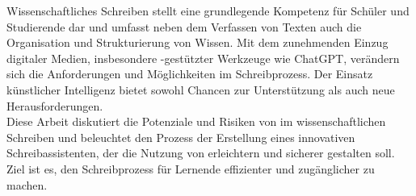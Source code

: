 \documentclass[../main.tex]{subfiles}
\begin{document}
Wissenschaftliches Schreiben stellt eine grundlegende Kompetenz für Schüler und Studierende 
dar und umfasst neben dem Verfassen von Texten auch die Organisation und Strukturierung von Wissen. 
Mit dem zunehmenden Einzug digitaler Medien, insbesondere -gestützter Werkzeuge wie ChatGPT, verändern 
sich die Anforderungen und Möglichkeiten im Schreibprozess. Der Einsatz künstlicher Intelligenz bietet sowohl 
Chancen zur Unterstützung als auch neue Herausforderungen.\\
Diese Arbeit diskutiert die Potenziale und Risiken von  im wissenschaftlichen Schreiben und beleuchtet den 
Prozess der Erstellung eines innovativen Schreibassistenten, der die Nutzung von  erleichtern und sicherer gestalten soll.
 Ziel ist es, den Schreibprozess für Lernende effizienter und zugänglicher zu machen.
\end{document}
